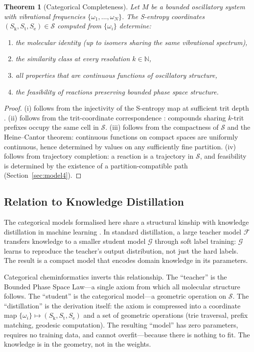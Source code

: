 \documentclass[11pt,twocolumn,a4paper]{article}
\newtheorem{theorem}{Theorem}[section]
\theoremstyle{definition}
\theoremstyle{remark}
\newcommand{\Sk}{S_{\mathrm{k}}}
\newcommand{\St}{S_{\mathrm{t}}}
\newcommand{\Se}{S_{\mathrm{e}}}
\newcommand{\Sspace}{\mathcal{S}}
\newcommand{\Natural}{\mathbb{N}}
\newcommand{\Teacher}{\mathcal{F}}
\newcommand{\Student}{\mathcal{G}}
\begin{document}
\begin{theorem}[Categorical Completeness]
\label{thm:completeness}
Let $M$ be a bounded oscillatory system with vibrational frequencies $\{\omega_1, \ldots, \omega_N\}$. The S-entropy coordinates $(\Sk, \St, \Se) \in \Sspace$ computed from $\{\omega_i\}$ determine:
\begin{enumerate}[nosep]
\item[(i)] the molecular identity (up to isomers sharing the same vibrational spectrum),
\item[(ii)] the similarity class at every resolution $k \in \Natural$,
\item[(iii)] all properties that are continuous functions of oscillatory structure,
\item[(iv)] the feasibility of reactions preserving bounded phase space structure.
\end{enumerate}
\end{theorem}

\begin{proof}
(i) follows from the injectivity of the S-entropy map at sufficient trit depth \citep[Theorem~5.1]{sachikonye2025c}. (ii) follows from the trit-coordinate correspondence \citep[Theorem~4.1]{sachikonye2025c}: compounds sharing $k$-trit prefixes occupy the same cell in $\Sspace$. (iii) follows from the compactness of $\Sspace$ and the Heine--Cantor theorem: continuous functions on compact spaces are uniformly continuous, hence determined by values on any sufficiently fine partition. (iv) follows from trajectory completion: a reaction is a trajectory in $\Sspace$, and feasibility is determined by the existence of a partition-compatible path (Section~\ref{sec:model4}).
\end{proof}

\subsection{Relation to Knowledge Distillation}

The categorical models formalised here share a structural kinship with knowledge distillation in machine learning \citep{hinton2015, gou2021}. In standard distillation, a large teacher model $\Teacher$ transfers knowledge to a smaller student model $\Student$ through soft label training: $\Student$ learns to reproduce the teacher's output distribution, not just the hard labels. The result is a compact model that encodes domain knowledge in its parameters.

Categorical cheminformatics inverts this relationship. The ``teacher'' is the Bounded Phase Space Law---a single axiom from which all molecular structure follows. The ``student'' is the categorical model---a geometric operation on $\Sspace$. The ``distillation'' is the derivation itself: the axiom is compressed into a coordinate map $\{\omega_i\} \mapsto (\Sk, \St, \Se)$ and a set of geometric operations (trie traversal, prefix matching, geodesic computation). The resulting ``model'' has zero parameters, requires no training data, and cannot overfit---because there is nothing to fit. The knowledge is in the geometry, not in the weights.
\end{document}
